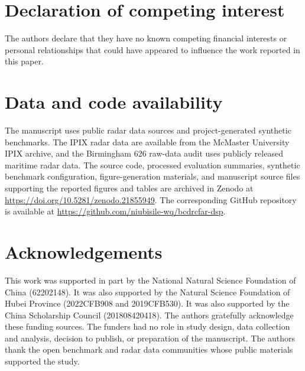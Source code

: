 \documentclass[preprint,12pt]{elsarticle}
\begin{document}
\section*{Declaration of competing interest}

The authors declare that they have no known competing financial interests or
personal relationships that could have appeared to influence the work reported
in this paper.

\section*{Data and code availability}

The manuscript uses public radar data sources and project-generated synthetic
benchmarks. The IPIX radar data are available from the McMaster University IPIX
archive, and the Birmingham 626 raw-data audit uses publicly released maritime
radar data. The source code, processed evaluation summaries, synthetic
benchmark configuration, figure-generation materials, and manuscript source
files supporting the reported figures and tables are archived in Zenodo at
\url{https://doi.org/10.5281/zenodo.21855949}. The corresponding GitHub
repository is available at
\url{https://github.com/niubisile-wq/bcdrcfar-dsp}.

\section*{Acknowledgements}

This work was supported in part by the National Natural Science Foundation of
China (62202148). It was also supported by the Natural Science Foundation of
Hubei Province (2022CFB908 and 2019CFB530). It was also supported by the China
Scholarship Council (201808420418). The authors gratefully acknowledge these
funding sources. The funders had no role in study design, data collection and
analysis, decision to publish, or preparation of the manuscript. The authors
thank the open benchmark and radar data communities whose public materials
supported the study.



\end{document}
